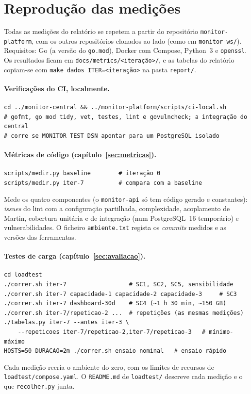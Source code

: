 \section{Reprodução das medições}
\label{anx:reproducao}

Todas as medições do relatório se repetem a partir do repositório \texttt{monitor-platform}, com os outros
repositórios clonados ao lado (como em \texttt{monitor-ws/}). Requisitos: Go (a versão do \texttt{go.mod}),
Docker com Compose, Python~3 e \texttt{openssl}. Os resultados ficam em \texttt{docs/metrics/<iteração>/}, e
as tabelas do relatório copiam-se com \texttt{make dados ITER=<iteração>} na pasta \texttt{report/}.

\paragraph{Verificações do CI, localmente.}
\begin{verbatim}
cd ../monitor-central && ../monitor-platform/scripts/ci-local.sh
# gofmt, go mod tidy, vet, testes, lint e govulncheck; a integração do central
# corre se MONITOR_TEST_DSN apontar para um PostgreSQL isolado
\end{verbatim}

\paragraph{Métricas de código (capítulo~\ref{sec:metricas}).}
\begin{verbatim}
scripts/medir.py baseline        # iteração 0
scripts/medir.py iter-7          # compara com a baseline
\end{verbatim}
Mede os quatro componentes (o \texttt{monitor-api} só tem código gerado e constantes): \emph{issues} do lint com a configuração partilhada, complexidade,
acoplamento de Martin, cobertura unitária e de integração (num PostgreSQL~16 temporário) e vulnerabilidades. O
ficheiro \texttt{ambiente.txt} regista os \emph{commits} medidos e as versões das ferramentas.

\paragraph{Testes de carga (capítulo~\ref{sec:avaliacao}).}
\begin{verbatim}
cd loadtest
./correr.sh iter-7                  # SC1, SC2, SC5, sensibilidade
./correr.sh iter-7 capacidade-1 capacidade-2 capacidade-3     # SC3
./correr.sh iter-7 dashboard-30d    # SC4 (~1 h 30 min, ~150 GB)
./correr.sh iter-7/repeticao-2 ...  # repetições (as mesmas medições)
./tabelas.py iter-7 --antes iter-3 \
    --repeticoes iter-7/repeticao-2,iter-7/repeticao-3   # mínimo-máximo
HOSTS=50 DURACAO=2m ./correr.sh ensaio nominal   # ensaio rápido
\end{verbatim}
Cada medição recria o ambiente do zero, com os limites de recursos de \texttt{loadtest/compose.yaml}. O
\texttt{README.md} de \texttt{loadtest/} descreve cada medição e o que \texttt{recolher.py} junta.

